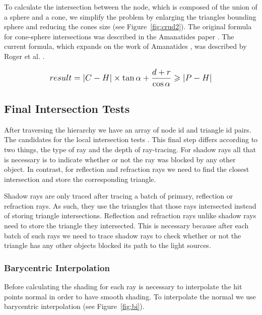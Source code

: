 To calculate the intersection between the node, which is composed of the union of a sphere and a cone, we simplify the problem by enlarging the triangles bounding sphere \cite{Ericson04} and reducing the cones size (see Figure~\ref{fig:crud2}). The original formula for cone-sphere intersections was described in the Amanatides paper \cite{Amanatides84}. The current formula, which expands on the work of Amanatides \cite{Amanatides84}, was described by Roger et al. \cite{Roger07}.

\begin{equation}
    \mathlarger{result = {|C - H|} \times \tan{\alpha} + \frac{d+r}{\cos{\alpha}} \geqslant {|P - H|}}
\end{equation}

\subsection{Final Intersection Tests}

After traversing the hierarchy we have an array of node id and triangle id pairs. The candidates for the local intersection tests \cite{Moller97}. This final step differs according to two things, the type of ray and the depth of ray-tracing. For shadow rays all that is necessary is to indicate whether or not the ray was blocked by any other object. In contrast, for reflection and refraction rays we need to find the closest intersection and store the corresponding triangle.

\medskip

Shadow rays are only traced after tracing a batch of primary, reflection or refraction rays. As such, they use the triangles that those rays intersected instead of storing triangle intersections. Reflection and refraction rays unlike shadow rays need to store the triangle they intersected. This is necessary because after each batch of such rays we need to trace shadow rays to check whether or not the triangle has any other objects blocked its path to the light sources. 

\subsubsection{Barycentric Interpolation}

Before calculating the shading for each ray is necessary to interpolate the hit points normal in order to have smooth shading.
To interpolate the normal we use barycentric interpolation (see Figure~\ref{fig:bi}). 

